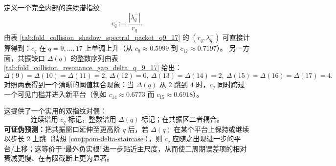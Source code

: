 

\begin{remark}\label{rem:pom-delta-cq-threshold}
定义一个完全内部的连续谱指纹
\[
c_q:=\frac{|\lambda_q^-|}{r_q}.
\]
由表 \ref{tab:fold_collision_shadow_spectral_packet_q9_17} 的 \((r_q,\lambda_q^-)\) 可直接计算得到：\(c_q\) 在 \(q=9,\dots,17\) 上单调上升（从 \(c_9\approx 0.5999\) 到 \(c_{17}\approx 0.7197\)）。
另一方面，共振缺口 \(\Delta(q)\) 的整数序列由表 \ref{tab:fold_collision_resonance_gap_delta_q_9_17} 给出：
\[
\Delta(9)=\Delta(10)=\Delta(11)=2,\ \Delta(12)=0,\ \Delta(13)=\Delta(14)=2,\ \Delta(15)=\Delta(16)=\Delta(17)=4.
\]
对照两表得到一个清晰的阈值耦合现象：当 \(\Delta(q)\) 从 \(2\) 跳到 \(4\) 时，\(c_q\) 同时跨过一个可见门槛并进入新平台（例如 \(c_{14}\approx 0.6773\) 而 \(c_{15}\approx 0.6918\)）。
\par
这提供了一个实用的双指纹对偶：
\[
\boxed{\ \text{连续谱用 }c_q\text{ 标记，整数谱用 }\Delta(q)\text{ 标记；在共振区二者耦合。}\ }
\]
\textbf{可证伪预测：}把共振窗口延伸至更高阶 \(q\) 后，若 \(\Delta(q)\) 在某个平台上保持或继续以步长 \(2\) 上跳（猜想 \ref{conj:pom-delta-staircase}），则 \(c_q\) 应随之出现进一步的平台/上移；这等价于“最外负实根”进一步贴近主尺度，从而使二周期误差项的相对衰减更慢、在有限截断上更为显著。
\end{remark}

